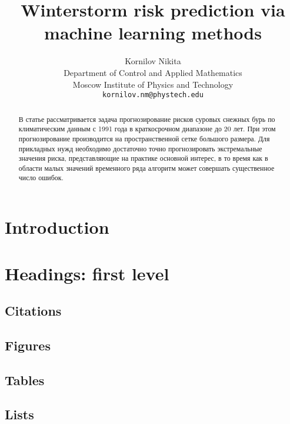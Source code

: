 \documentclass{article}
\title{Winterstorm risk prediction via machine learning methods}
\author{ Kornilov Nikita\\
	Department of Control and Applied Mathematics\\
	Moscow Institute of Physics and Technology\\
	\texttt{kornilov.nm@phystech.edu} \\
}
\date{}
\begin{document}
\maketitle

\begin{abstract}
	В статье рассматривается задача прогнозирование рисков суровых снежных бурь по климатическим данным с 1991 года в краткосрочном диапазоне до 20 лет. При этом прогнозирование производится на пространственной сетке большого размера. Для прикладных нужд необходимо достаточно точно прогнозировать экстремальные значения риска, представляющие на практике основной интерес, в то время как в области малых значений временного ряда алгоритм может совершать существенное число ошибок.
\end{abstract}



\section{Introduction}



\section{Headings: first level}

\subsection{Citations}

\subsection{Figures}


\subsection{Tables}

\subsection{Lists}





\end{document}
